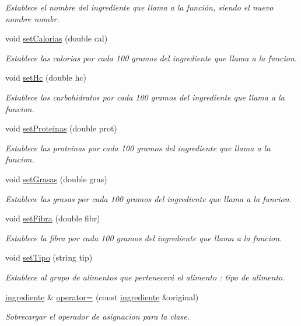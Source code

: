 \begin{DoxyCompactItemize}
\begin{DoxyCompactList}\small\item\em Establece el nombre del ingrediente que llama a la función, siendo el nuevo nombre nombr. \end{DoxyCompactList}\item 
void \hyperlink{classingrediente_ae9852183a6cdcf8dc3b99be6c80036f5}{set\+Calorias} (double cal)
\begin{DoxyCompactList}\small\item\em Establece las calorias por cada 100 gramos del ingrediente que llama a la funcion. \end{DoxyCompactList}\item 
void \hyperlink{classingrediente_a832c6b1bd7b1a23299e685df560cc168}{set\+Hc} (double hc)
\begin{DoxyCompactList}\small\item\em Establece los carbohidratos por cada 100 gramos del ingrediente que llama a la funcion. \end{DoxyCompactList}\item 
void \hyperlink{classingrediente_ab01241c7e378d26c09b1b453c68605c5}{set\+Proteinas} (double prot)
\begin{DoxyCompactList}\small\item\em Establece las proteinas por cada 100 gramos del ingrediente que llama a la funcion. \end{DoxyCompactList}\item 
void \hyperlink{classingrediente_a726805f6d65d583f7ca96102e13b9715}{set\+Grasas} (double gras)
\begin{DoxyCompactList}\small\item\em Establece las grasas por cada 100 gramos del ingrediente que llama a la funcion. \end{DoxyCompactList}\item 
void \hyperlink{classingrediente_adb475903f54423f6800b96ee995ed31c}{set\+Fibra} (double fibr)
\begin{DoxyCompactList}\small\item\em Establece la fibra por cada 100 gramos del ingrediente que llama a la funcion. \end{DoxyCompactList}\item 
\mbox{\label{classingrediente_a3dc0368a8e52206efc1a088e223bb293}} 
void \hyperlink{classingrediente_a3dc0368a8e52206efc1a088e223bb293}{set\+Tipo} (string tip)
\begin{DoxyCompactList}\small\item\em Establece al grupo de alimentos que pertenecerá el alimento \+: tipo de alimento. \end{DoxyCompactList}\item 
\hyperlink{classingrediente}{ingrediente} \& \hyperlink{classingrediente_a03726c163995c6f2ca4e4cc47d2b5d4d}{operator=} (const \hyperlink{classingrediente}{ingrediente} \&original)
\begin{DoxyCompactList}\small\item\em Sobrecargar el operador de asignacion para la clase. \end{DoxyCompactList}\end{DoxyCompactItemize}

